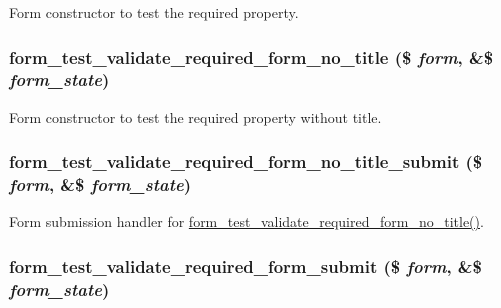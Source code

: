 \label{form__test_8module_a19d7e573a59984582ba545d6a796fe2b}
Form constructor to test the required property. \hypertarget{form__test_8module_a29c8e37557cd20532543c7e72211b3e9}{
\subsubsection[{form\_\-test\_\-validate\_\-required\_\-form\_\-no\_\-title}]{\setlength{\rightskip}{0pt plus 5cm}form\_\-test\_\-validate\_\-required\_\-form\_\-no\_\-title (\$ {\em form}, \/  \&\$ {\em form\_\-state})}}
\label{form__test_8module_a29c8e37557cd20532543c7e72211b3e9}
Form constructor to test the required property without title. \hypertarget{form__test_8module_a1893cad2ffe411688e85e59202ac3ac0}{
\subsubsection[{form\_\-test\_\-validate\_\-required\_\-form\_\-no\_\-title\_\-submit}]{\setlength{\rightskip}{0pt plus 5cm}form\_\-test\_\-validate\_\-required\_\-form\_\-no\_\-title\_\-submit (\$ {\em form}, \/  \&\$ {\em form\_\-state})}}
\label{form__test_8module_a1893cad2ffe411688e85e59202ac3ac0}
Form submission handler for \hyperlink{form__test_8module_a29c8e37557cd20532543c7e72211b3e9}{form\_\-test\_\-validate\_\-required\_\-form\_\-no\_\-title()}. \hypertarget{form__test_8module_aa70eaa6503e093b6744817fb5e1aa905}{
\subsubsection[{form\_\-test\_\-validate\_\-required\_\-form\_\-submit}]{\setlength{\rightskip}{0pt plus 5cm}form\_\-test\_\-validate\_\-required\_\-form\_\-submit (\$ {\em form}, \/  \&\$ {\em form\_\-state})}}

